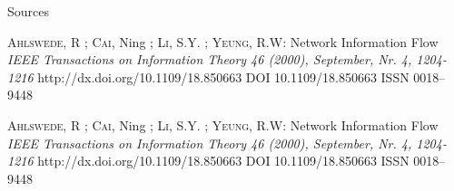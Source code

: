 \begin{frame}[allowframebreaks]{Sources}
\begin{thebibliography}{9}
    \textsc{Ahlswede}, R ; \textsc{Cai}, Ning  ; \textsc{Li},
      S.Y. ; \textsc{Yeung},  R.W:
    \newblock Network Information Flow
    \emph{IEEE Transactions on Information Theory 46 (2000), September, Nr. 4, 1204-1216}
    \newblock http://dx.doi.org/10.1109/18.850663
    \newblock DOI 10.1109/18.850663
    \newblock ISSN 0018–9448

    \textsc{Ahlswede}, R ; \textsc{Cai}, Ning  ; \textsc{Li},
      S.Y. ; \textsc{Yeung},  R.W:
    \newblock Network Information Flow
    \emph{IEEE Transactions on Information Theory 46 (2000), September, Nr. 4, 1204-1216}
    \newblock http://dx.doi.org/10.1109/18.850663
    \newblock DOI 10.1109/18.850663
    \newblock ISSN 0018–9448

  \end{thebibliography} 
  
\end{frame}
\multipleslidefalse


\miniframeson